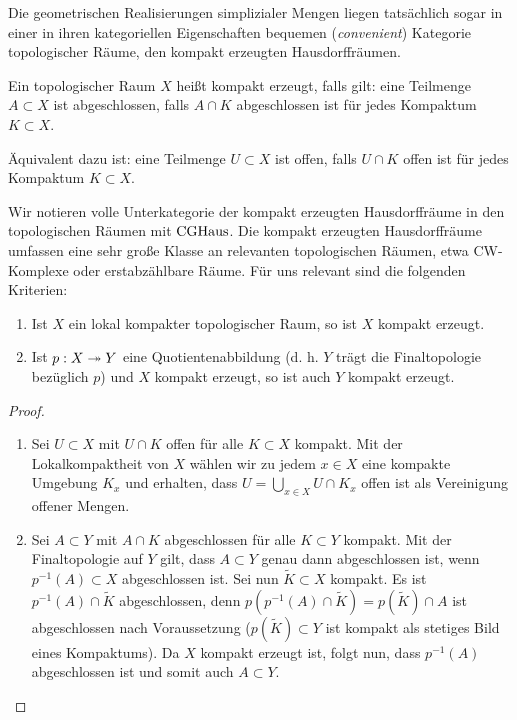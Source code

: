 Die geometrischen Realisierungen simplizialer Mengen liegen
tatsächlich sogar in einer in ihren kategoriellen Eigenschaften
bequemen (\emph{convenient}) Kategorie topologischer Räume, den
kompakt erzeugten Hausdorffräumen.

\begin{defn}
  Ein topologischer Raum $X$ heißt kompakt erzeugt, falls gilt: eine
  Teilmenge $A \subset X$ ist abgeschlossen, falls $A \cap K$
  abgeschlossen ist für jedes Kompaktum $K \subset X$.
\end{defn}
\begin{bem}
  Äquivalent dazu ist: eine Teilmenge $U \subset X$ ist offen, falls
  $U \cap K$ offen ist für jedes Kompaktum $K \subset X$.
\end{bem}
Wir notieren volle Unterkategorie der kompakt erzeugten Hausdorffräume
in den topologischen Räumen mit $\operatorname{CGHaus}$. Die kompakt erzeugten
Hausdorffräume umfassen eine sehr große Klasse an relevanten
topologischen Räumen, etwa CW-Komplexe oder erstabzählbare Räume.
Für uns relevant sind die folgenden Kriterien:
\begin{lemma}
  \begin{enumerate}[label=(\roman*)]
    \item Ist $X$ ein lokal kompakter topologischer Raum, so ist $X$
      kompakt erzeugt.
  \item Ist $p: X \twoheadrightarrow Y$ eine Quotientenabbildung (d. h. $Y$ trägt
    die Finaltopologie bezüglich $p$) und $X$ kompakt erzeugt, so ist
    auch $Y$ kompakt erzeugt.
  \end{enumerate}
\end{lemma}
\begin{proof}
  \begin{enumerate}[label=(\roman*)]
    \item Sei $U \subset X$ mit $U \cap K$ offen für alle $K \subset
      X$ kompakt. Mit der Lokalkompaktheit von $X$ wählen wir zu jedem
      $x \in X$ eine kompakte Umgebung $K_x$ und erhalten, dass $U =
      \bigcup_{x \in X} U \cap K_x$ offen ist als Vereinigung offener
      Mengen.
    \item Sei $A \subset Y$ mit $A \cap K$ abgeschlossen für alle $K
      \subset Y$ kompakt. Mit der Finaltopologie auf $Y$ gilt, dass $A
      \subset Y$ genau dann abgeschlossen ist, wenn $p^{-1}(A) \subset
      X$ abgeschlossen ist. Sei nun $\tilde{K} \subset X$ kompakt. Es
      ist $p^{-1}(A) \cap \tilde{K}$ abgeschlossen, denn $p(p^{-1}(A)
      \cap \tilde{K}) = p(\tilde{K}) \cap A$ ist abgeschlossen nach
      Voraussetzung ($p(\tilde{K}) \subset Y$ ist kompakt als stetiges
      Bild eines Kompaktums). Da $X$ kompakt erzeugt ist, folgt nun,
      dass $p^{-1}(A)$ abgeschlossen ist und somit auch $A \subset Y$.
  \end{enumerate}
\end{proof}





